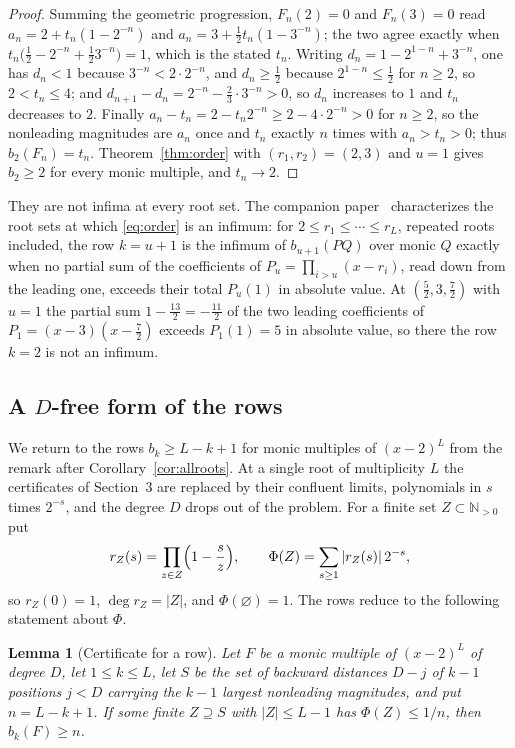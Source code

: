 \documentclass[11pt]{article}
\newtheorem{lemma}[theorem]{Lemma}
\newcommand{\N}{\mathbb N}
\begin{document}
\begin{proof}
Summing the geometric progression, $F_n(2)=0$ and $F_n(3)=0$ read
$a_n=2+t_n(1-2^{-n})$ and $a_n=3+\tfrac12t_n(1-3^{-n})$; the two agree exactly
when $t_n\bigl(\tfrac12-2^{-n}+\tfrac123^{-n}\bigr)=1$, which is the stated
$t_n$.  Writing $d_n=1-2^{1-n}+3^{-n}$, one has $d_n<1$ because
$3^{-n}<2\cdot2^{-n}$, and $d_n\ge\tfrac12$ because $2^{1-n}\le\tfrac12$ for
$n\ge2$, so $2<t_n\le4$; and
$d_{n+1}-d_n=2^{-n}-\tfrac23\cdot3^{-n}>0$, so $d_n$ increases to $1$ and
$t_n$ decreases to $2$.  Finally $a_n-t_n=2-t_n2^{-n}\ge2-4\cdot2^{-n}>0$ for
$n\ge2$, so the nonleading magnitudes are $a_n$ once and $t_n$ exactly $n$
times with $a_n>t_n>0$; thus $b_2(F_n)=t_n$.  Theorem~\ref{thm:order} with
$(r_1,r_2)=(2,3)$ and $u=1$ gives $b_2\ge2$ for every monic multiple, and
$t_n\to2$.
\end{proof}

They are not infima at every root set.  The companion
paper~\cite{coefficient-mass-attainment} characterizes the root sets at
which \eqref{eq:order} is an infimum: for $2\le r_1\le\cdots\le r_L$,
repeated roots included, the row $k=u+1$ is the infimum of $b_{u+1}(PQ)$
over monic $Q$ exactly when no partial sum of the coefficients of
$P_u=\prod_{i>u}(x-r_i)$, read down from the leading one, exceeds their
total $P_u(1)$ in absolute value.  At $(\tfrac52,3,\tfrac72)$ with $u=1$ the
partial sum $1-\tfrac{13}2=-\tfrac{11}2$ of the two leading coefficients of
$P_1=(x-3)(x-\tfrac72)$ exceeds $P_1(1)=5$ in absolute value, so there the row $k=2$ is not an infimum.

\subsection{A \texorpdfstring{$D$}{D}-free form of the rows}

We return to the rows $b_k\ge L-k+1$ for monic multiples of
$(x-2)^L$ from the remark after Corollary~\ref{cor:allroots}.  At a
single root of multiplicity $L$ the certificates of Section~3 are replaced
by their confluent limits, polynomials in $s$ times $2^{-s}$, and the
degree $D$ drops out of the problem.  For a finite set $Z\subset\N_{>0}$ put
\[
  r_Z(s)=\prod_{z\in Z}\Bigl(1-\frac sz\Bigr),\qquad
  \Phi(Z)=\sum_{s\ge1}|r_Z(s)|\,2^{-s},
\]
so $r_Z(0)=1$, $\deg r_Z=|Z|$, and $\Phi(\varnothing)=1$.  The rows reduce to
the following statement about $\Phi$.

\begin{lemma}[Certificate for a row]\label{lem:rowcert}
Let $F$ be a monic multiple of $(x-2)^L$ of degree $D$, let $1\le k\le L$,
let $S$ be the set of backward distances $D-j$ of $k-1$ positions $j<D$
carrying the $k-1$ largest nonleading magnitudes, and put $n=L-k+1$.  If
some finite $Z\supseteq S$ with $|Z|\le L-1$ has $\Phi(Z)\le1/n$, then
$b_k(F)\ge n$.
\end{lemma}
\end{document}
